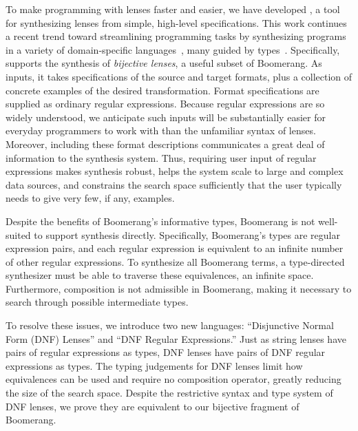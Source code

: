 \documentclass[acmsmall]{acmart}
\begin{document}
To make programming with lenses faster and easier, we have
developed \Optician{}, a
tool for synthesizing lenses from simple, high-level specifications.
This work continues a recent trend toward streamlining programming tasks
by synthesizing programs in a variety of domain-specific
languages~\cite{flashfill,le-pldi-2014,perelman2014test,DBLP:journals/corr/FengMGDC16},
many guided by
types~\cite{osera+:pldi15,frankle+:popl16,armando+:pldi16,feser-pldi-2015,morpheus}.  
Specifically, \Optician{} supports the synthesis of \emph{bijective lenses}, a
useful subset of Boomerang. 
As inputs, it takes specifications of the source and target formats, plus
a collection of concrete examples of the desired 
transformation.  Format specifications are supplied as ordinary regular
expressions.
Because regular expressions are so widely understood, we anticipate such
inputs will be substantially easier for everyday programmers to work with
than the unfamiliar syntax of lenses.  Moreover, including these format
descriptions communicates a
great deal of information to the synthesis system.  Thus, requiring user input
of regular expressions
makes synthesis robust, 
helps the system scale to large and complex data sources, and 
constrains the search space sufficiently that the user typically needs
to give very few, if any, examples.

Despite the benefits of Boomerang's informative types,
Boomerang is not well-suited to support synthesis directly.
Specifically, Boomerang's types are regular expression
pairs, and each regular expression is equivalent to an infinite
number of other regular expressions.
To synthesize all Boomerang terms, a type-directed synthesizer
must be able to traverse these equivalences, an infinite space.  
Furthermore, composition is not
admissible in Boomerang, making it necessary to search through possible
intermediate types.

To resolve these issues, we introduce two new languages: 
``Disjunctive Normal Form (DNF) Lenses'' and ``DNF Regular Expressions.''
Just as string lenses have pairs of regular expressions as types, DNF lenses
have pairs of DNF regular expressions as types.
The typing judgements for DNF lenses limit how equivalences can be
used  and require no composition operator, greatly reducing the size
of the search space.
Despite the restrictive syntax and type system of DNF lenses, we prove they are
equivalent to our bijective fragment of Boomerang.
\end{document}
